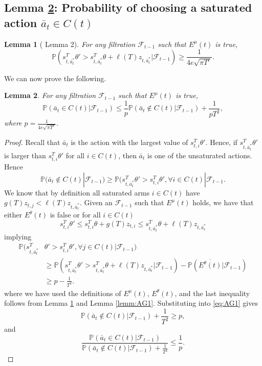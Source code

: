 \documentclass{article}
\newtheorem{lemma}{Lemma}
\begin{document}
\begin{appendices}
\subsection{Lemma \ref{lemm:AG3}: Probability of choosing a saturated action $\bar{a}_t \in C(t)$}
\begin{lemma}[\cite{agrawal2013thompson} Lemma 2]\label{lemm:AG2}
For any filtration $\mathcal{F}_{t-1}$ such that $E^\mu(t)$ is true, 
\[
\mathbb{P}(s_{t,\bar{a}^*_t}^T\theta' > s_{t,\bar{a}^*_t}^T\theta + \ell(T) z_{t,\bar{a}^*_t} | \mathcal{F}_{t-1}) \geq \frac{1}{4e\sqrt{\pi T^\epsilon}}.
\]
\end{lemma}
We can now prove the following.
\begin{lemma}\label{lemm:AG3}
For any filtration $\mathcal{F}_{t-1}$ such that $E^\mu(t)$ is true, 
\[
\mathbb{P}(\bar{a}_t \in C(t) | \mathcal{F}_{t-1})\leq \frac{1}{p}\mathbb{P}(\bar{a}_t \notin C(t) | \mathcal{F}_{t-1}) + \frac{1}{p T^2},
\]
where $p = \frac{1}{4 e \sqrt{\pi T^\epsilon}}$.
\end{lemma}
\begin{proof}
Recall that $\bar{a}_t$ is the action with the largest value of $s_{t,i}^T \theta'$. Hence, if $s_{t,\bar{a}^*_t}^T \theta'$ is larger than $s_{t,i}^T \theta'$ for all $i \in C(t)$, then $\bar{a}_t$ is one of the unsaturated actions.
Hence
\begin{equation}\label{eq:AG1}
\mathbb{P}(\bar{a}_t \notin C(t) | \mathcal{F}_{t-1}) \geq \mathbb{P}(s_{t,\bar{a}^*_t}^T \theta' > s_{t,i}^T \theta', \forall i \in C(t) | \mathcal{F}_{t-1}.
\end{equation}
We know that by definition all saturated arms $i \in C(t)$ have $g(T) z_{t,j} < \ell(T) z_{t,\bar{a}^*_t}$. %
Given an $\mathcal{F}_{t-1}$ such that $E^\mu(t)$ holds, we have that either $E^\theta(t)$ is false or for all $i \in C(t)$
\[
s_{t,i}^T \theta' \leq s_{t,i}^T\theta + g(T) z_{t,i} \leq s_{t,\bar{a}^*_t}^T \theta + \ell(T) z_{t,\bar{a}^*_t}
\]
implying
\begin{align*}
\mathbb{P}(s_{t,\bar{a}^*_t}^T &\theta' > s_{t,i}^T \theta', \forall j \in C(t) |\mathcal{F}_{t-1}) \\
&\geq \mathbb{P}(s_{t,\bar{a}^*_t}^T \theta' > s_{t,\bar{a}^*_t}^T \theta +\ell(T) z_{t,\bar{a}^*_t}|\mathcal{F}_{t-1})- \mathbb{P}(\overline{E^\theta(t)}|\mathcal{F}_{t-1})\\
&\geq p - \frac{1}{T^2}.
\end{align*}
where we have used the definitions of $E^\mu(t)$, $E^\theta(t)$, and the last inequality follows from Lemma \ref{lemm:AG2} and Lemma \ref{lemm:AG1}. Substituting into \eqref{eq:AG1} gives
\[
\mathbb{P}(\bar{a}_t \notin C(t) | \mathcal{F}_{t-1}) + \frac{1}{T^2} \geq p,
\]
and
\[
\frac{\mathbb{P}(\bar{a}_t \in C(t) | \mathcal{F}_{t-1})}{\mathbb{P}(\bar{a}_t \notin C(t) | \mathcal{F}_{t-1})+\frac{1}{T^2}}\leq \frac{1}{p}.
\]


\end{proof}
\end{appendices}
\end{document}
